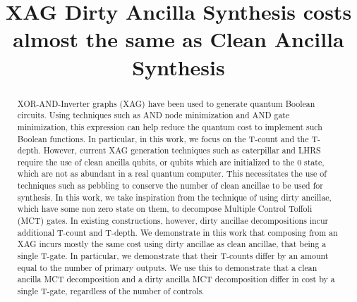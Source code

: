 \documentclass[conference]{IEEEtran}
\begin{document}
\title{XAG Dirty Ancilla Synthesis costs almost the same as Clean Ancilla Synthesis}
\author{
    \IEEEauthorblockN{\phantom{David Clarino}}
    \IEEEauthorblockA{\phantom{Ritsumeikan University} \\
      \phantom{dclarino@fc.ritsumei.ac.jp}}
    \and 
    \IEEEauthorblockN{\phantom{Shigeru Yamashita}}
    \IEEEauthorblockA{\phantom{Ritsumeikan University} \\
      \phantom{ger@cs.ritsumei.ac.jp}}
}

\maketitle

\begin{abstract}
  XOR-AND-Inverter graphs (XAG) have been used to generate quantum Boolean circuits. Using
  techniques such as AND node minimization and AND gate minimization, this expression can
  help reduce the quantum cost to implement such Boolean functions. In particular, in this
  work, we focus on the T-count and the T-depth. However, current XAG generation techniques
  such as caterpillar and LHRS require the use of clean ancilla qubits, or qubits which are
  initialized to the 0 state, which are not as abundant in a real quantum computer.
  This necessitates the use of techniques such as pebbling to conserve the number of clean
  ancillae to be used for synthesis. In this work, we take inspiration from the technique
  of using dirty ancillae, which have some non zero state on them, to decompose Multiple
  Control Toffoli (MCT) gates. In existing constructions, however, dirty ancillae
  decompositions incur additional T-count and T-depth. We demonstrate in this work that
  composing from an XAG incurs mostly the same cost using dirty ancillae as clean ancillae,
  that being a single T-gate. In particular, we demonstrate that their T-counts differ by
  an amount equal to the number of primary outputs. We use this to demonstrate that a
  clean ancilla MCT decomposition and a dirty ancilla MCT decomposition differ in cost by a
  single T-gate, regardless of the number of controls. 
\end{abstract}
\end{document}

